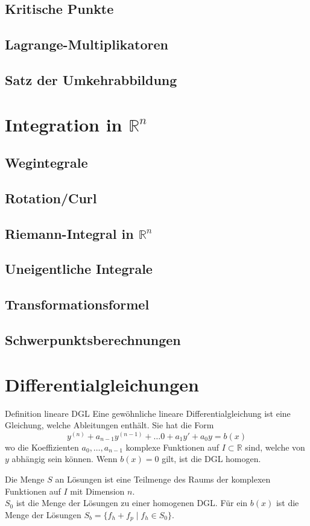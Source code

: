 \documentclass[a4paper,10pt]{article}
\def\R{\mathbb{R}}
\begin{document}
\subsection{Kritische Punkte}
\subsection{Lagrange-Multiplikatoren}
\subsection{Satz der Umkehrabbildung}
\section{Integration in \(\R^n\)}
\subsection{Wegintegrale}
\subsection{Rotation/Curl}
\subsection{Riemann-Integral in \(\R^n\)}
\subsection{Uneigentliche Integrale}
\subsection{Transformationsformel}
\subsection{Schwerpunktsberechnungen}

\pagebreak

\maketitle



\section{Differentialgleichungen}
\begin{mainbox}{Definition lineare DGL}
  Eine gewöhnliche lineare Differentialgleichung ist eine Gleichung, welche Ableitungen enthält. Sie hat die Form \[y^{(n)} + a_{n-1} y^{(n-1)} + \ldots0 + a_1 y' + a_0y = b(x)\]
  wo die Koeffizienten \(a_0, \ldots, a_{n-1}\) komplexe Funktionen auf \(I \subset \R\) sind, welche von \(y\) abhängig sein können. Wenn \(b(x) = 0\) gilt, ist die DGL homogen.
\end{mainbox}
Die Menge \(S\) an Lösungen ist eine Teilmenge des Raums der komplexen Funktionen auf \(I\) mit Dimension \(n\). \\
\(S_0\) ist die Menge der Lösungen zu einer homogenen DGL. Für ein \(b(x)\) ist die Menge der Lösungen \(S_b = \{f_h + f_p \mid f_h \in S_0\}\).
\end{document}
